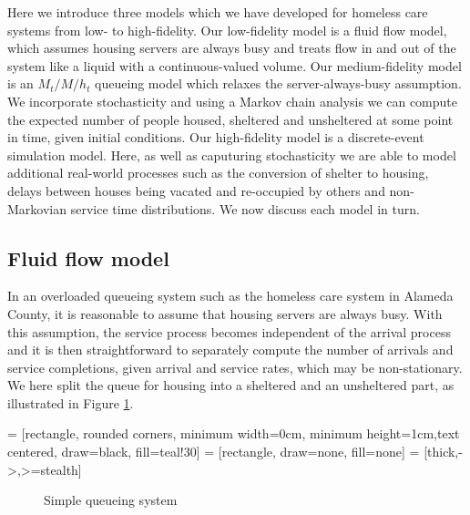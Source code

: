 \documentclass{article}
\begin{document}
Here we introduce three models which we have developed for homeless care systems from low- to high-fidelity. Our low-fidelity model is a fluid flow model, which assumes housing servers are always busy and treats flow in and out of the system like a liquid with a continuous-valued volume. Our medium-fidelity model is an $M_t/M/h_t$ queueing model which relaxes the server-always-busy assumption. We incorporate stochasticity and using a Markov chain analysis we can compute the expected number of people housed, sheltered and unsheltered at some point in time, given initial conditions. Our high-fidelity model is a discrete-event simulation model. Here, as well as caputuring stochasticity we are able to model additional real-world processes such as the conversion of shelter to housing, delays between houses being vacated and re-occupied by others and non-Markovian service time distributions. We now discuss each model in turn. \newline

\subsection{Fluid flow model} \label{fluid-model}

In an overloaded queueing system such as the homeless care system in Alameda County, it is reasonable to assume that housing servers are always busy. With this assumption, the service process becomes independent of the arrival process and it is then straightforward to separately compute the number of arrivals and service completions, given arrival and service rates, which may be non-stationary. We here split the queue for housing into a sheltered and an unsheltered part, as illustrated in Figure \ref{fig:simple-q}. 

 = [rectangle, rounded corners, minimum width=0cm, minimum height=1cm,text centered, draw=black, fill=teal!30]
 = [rectangle, draw=none, fill=none]
 = [thick,->,>=stealth]
\begin{figure} 
  \begin{center}
    \caption{Simple queueing system} \label{fig:simple-q}
  \end{center}
\end{figure}
\end{document}
